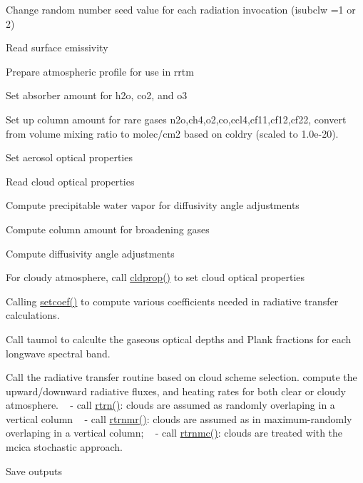 \begin{DoxyEnumerate}
\item Change random number seed value for each radiation invocation (isubclw =1 or 2)
\item Read surface emissivity
\item Prepare atmospheric profile for use in rrtm
\item Set absorber amount for h2o, co2, and o3
\item Set up column amount for rare gases n2o,ch4,o2,co,ccl4,cf11,cf12,cf22, convert from volume mixing ratio to molec/cm2 based on coldry (scaled to 1.\+0e-\/20).
\item Set aerosol optical properties
\item Read cloud optical properties
\item Compute precipitable water vapor for diffusivity angle adjustments
\item Compute column amount for broadening gases
\item Compute diffusivity angle adjustments
\item For cloudy atmosphere, call \hyperlink{namespacemodule__radlw__main_a8fb170c933c1644e03d8aaba2451ee0f}{cldprop()} to set cloud optical properties
\item Calling \hyperlink{namespacemodule__radlw__main_a801f8ecd9281b8966caf536bebc5cc22}{setcoef()} to compute various coefficients needed in radiative transfer calculations.
\item Call taumol to calculte the gaseous optical depths and Plank fractions for each longwave spectral band.
\item Call the radiative transfer routine based on cloud scheme selection. compute the upward/downward radiative fluxes, and heating rates for both clear or cloudy atmosphere. ~\newline
 -\/ call \hyperlink{namespacemodule__radlw__main_a34aff059dd13272a3c45818ec40ba6d3}{rtrn()}\+: clouds are assumed as randomly overlaping in a vertical column ~\newline
 -\/ call \hyperlink{namespacemodule__radlw__main_ad8f07b8a0e3dfa639b970d756824b9d3}{rtrnmr()}\+: clouds are assumed as in maximum-\/randomly overlaping in a vertical column; ~\newline
 -\/ call \hyperlink{namespacemodule__radlw__main_a51d42f46321972ffdca4880185506ac5}{rtrnmc()}\+: clouds are treated with the mcica stochastic approach.
\item Save outputs 
\end{DoxyEnumerate}

